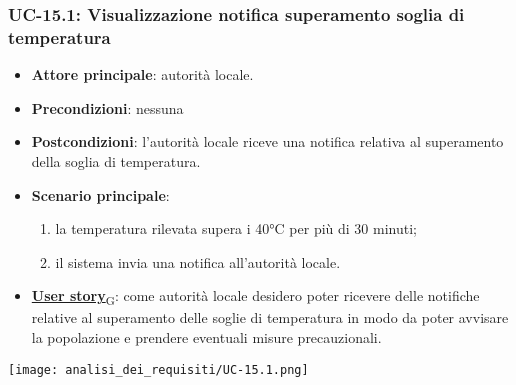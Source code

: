 \subsubsection{UC-15.1: Visualizzazione notifica superamento soglia di temperatura}
\begin{itemize}
	\item \textbf{Attore principale}: autorità locale.
	\item \textbf{Precondizioni}: nessuna
	\item \textbf{Postcondizioni}: l'autorità locale riceve una notifica relativa al superamento della soglia di temperatura.
	\item \textbf{Scenario principale}:
	      \begin{enumerate}
		      \item la temperatura rilevata supera i 40°C per più di 30 minuti;
		      \item il sistema invia una notifica all'autorità locale.
	      \end{enumerate}
	\item \href{https://7last.github.io/docs/rtb/documentazione-interna/glossario\#user-story}{\textbf{User story}\textsubscript{G}}:
	      come autorità locale desidero poter ricevere delle notifiche relative al superamento delle soglie di temperatura
	      in modo da poter avvisare la popolazione e prendere eventuali misure precauzionali.
\end{itemize}
\begin{center}
	\texttt{[image: analisi\_dei\_requisiti/UC-15.1.png]}
\end{center}

